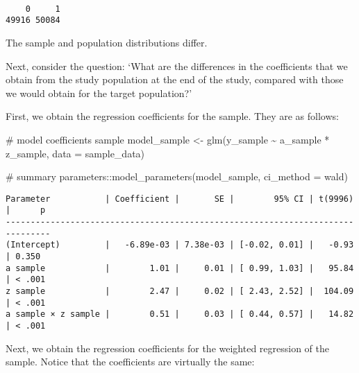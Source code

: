 \documentclass[
  single column]{article}
\newenvironment{Shaded}{\begin{snugshade}}{\end{snugshade}}
\newcommand{\AttributeTok}[1]{\textcolor[rgb]{0.40,0.45,0.13}{#1}}
\newcommand{\CommentTok}[1]{\textcolor[rgb]{0.37,0.37,0.37}{#1}}
\newcommand{\FunctionTok}[1]{\textcolor[rgb]{0.28,0.35,0.67}{#1}}
\newcommand{\NormalTok}[1]{\textcolor[rgb]{0.00,0.23,0.31}{#1}}
\newcommand{\OtherTok}[1]{\textcolor[rgb]{0.00,0.23,0.31}{#1}}
\newcommand{\SpecialCharTok}[1]{\textcolor[rgb]{0.37,0.37,0.37}{#1}}
\newcommand{\StringTok}[1]{\textcolor[rgb]{0.13,0.47,0.30}{#1}}
\begin{document}
\begin{Shaded}
\end{Shaded}

\begin{verbatim}

    0     1 
49916 50084 
\end{verbatim}

The sample and population distributions differ.

Next, consider the question: `What are the differences in the
coefficients that we obtain from the study population at the end of the
study, compared with those we would obtain for the target population?'

First, we obtain the regression coefficients for the sample. They are as
follows:

\begin{Shaded}
\begin{Highlighting}[]
\CommentTok{\# model coefficients sample}
\NormalTok{model\_sample  }\OtherTok{\textless{}{-}} \FunctionTok{glm}\NormalTok{(y\_sample }\SpecialCharTok{\textasciitilde{}}\NormalTok{ a\_sample }\SpecialCharTok{*}\NormalTok{ z\_sample, }
  \AttributeTok{data =}\NormalTok{ sample\_data)}

\CommentTok{\# summary}
\NormalTok{parameters}\SpecialCharTok{::}\FunctionTok{model\_parameters}\NormalTok{(model\_sample, }\AttributeTok{ci\_method =} \StringTok{\textquotesingle{}wald\textquotesingle{}}\NormalTok{)}
\end{Highlighting}
\end{Shaded}

\begin{verbatim}
Parameter           | Coefficient |       SE |        95% CI | t(9996) |      p
-------------------------------------------------------------------------------
(Intercept)         |   -6.89e-03 | 7.38e-03 | [-0.02, 0.01] |   -0.93 | 0.350 
a sample            |        1.01 |     0.01 | [ 0.99, 1.03] |   95.84 | < .001
z sample            |        2.47 |     0.02 | [ 2.43, 2.52] |  104.09 | < .001
a sample × z sample |        0.51 |     0.03 | [ 0.44, 0.57] |   14.82 | < .001
\end{verbatim}

Next, we obtain the regression coefficients for the weighted regression
of the sample. Notice that the coefficients are virtually the same:
\end{document}
